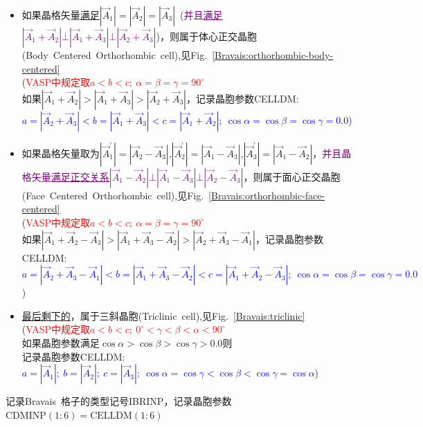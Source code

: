 \documentclass{article}      %
\begin{document}
\begin{description}
\begin{itemize}
			\item 如果晶格矢量\underline{满足}$|\vec A_1|=|\vec A_2|=|\vec A_3|$~(\textcolor{purple}{并且\underline{满足}$|\vec A_1+\vec A_2|\bot|\vec A_1+\vec A_3|\bot|\vec A_2+\vec A_3|$})，则属于体心正交晶胞(\textrm{Body~Centered~Orthorhombic~cell}),见\textrm{Fig.~}\ref{Bravais:orthorhombic-body-centered}\\
				(\textcolor{red}{\textrm{VASP}中规定取$a<b<c;~\alpha=\beta=\gamma=90^{\circ}$}\\
						如果$|\vec A_1+\vec A_2|>|\vec A_1+\vec A_3|>|\vec A_2+\vec A_3|$，记录晶胞参数\textrm{CELLDM}:\\
						\textcolor{blue}{$a=|\vec A_2+\vec A_3|<b=|\vec A_1+\vec A_3|<c=|\vec A_1+\vec A_2|;~\cos\alpha=\cos\beta=\cos\gamma=0.0$})
					\item 如果晶格矢量取为$|\vec A_1^{\prime}|=|\vec A_2-\vec A_3|$,$|\vec A_2^{\prime}|=|\vec A_1-\vec A_3|$,$|\vec A_3^{\prime}|=|\vec A_1-\vec A_2|$，\textcolor{purple}{并且晶格矢量\underline{满足正交关系}$|\vec A_1-\vec A_2|\bot|\vec A_1-\vec A_3|\bot|\vec A_2-\vec A_3|$}，则属于面心正交晶胞(\textrm{Face~Centered~Orthorhombic~cell}),见\textrm{Fig.~}\ref{Bravais:orthorhombic-face-centered}\\
				(\textcolor{red}{\textrm{VASP}中规定取$a<b<c;~\alpha=\beta=\gamma=90^{\circ}$}\\
						如果$|\vec A_1+\vec A_2-\vec A_3|>|\vec A_1+\vec A_3-\vec A_2|>|\vec A_2+\vec A_3-\vec A_1|$，记录晶胞参数\textrm{CELLDM}:\\
						\textcolor{blue}{$a=|\vec A_2+\vec A_3-\vec A_1|<b=|\vec A_1+\vec A_3-\vec A_2|<c=|\vec A_1+\vec A_2-\vec A_3|;~\cos\alpha=\cos\beta=\cos\gamma=0.0$})
					\item \underline{最后剩下的}，属于三斜晶胞(\textrm{Triclinic~cell}),见\textrm{Fig.~}\ref{Bravais:triclinic}\\
						(\textcolor{red}{\textrm{VASP}中规定取$a<b<c;~0^{\circ}<\gamma<\beta<\alpha<90^{\circ}$}\\
						如果晶胞参数满足$\cos\alpha>\cos\beta>\cos\gamma>0.0$则\\
						记录晶胞参数\textrm{CELLDM}:~\textcolor{blue}{$a=|\vec A_1|;~b=|\vec A_2|;~c=|\vec A_3|;~\cos\alpha=\cos\gamma<\cos\beta<\cos\gamma=\cos\alpha$})
		\end{itemize}
\end{description}
记录\textrm{Bravais~}格子的类型记号\textrm{IBRINP}，记录晶胞参数$\mathrm{CDMINP}(1:6)=\mathrm{CELLDM}(1:6)$
\end{document}
